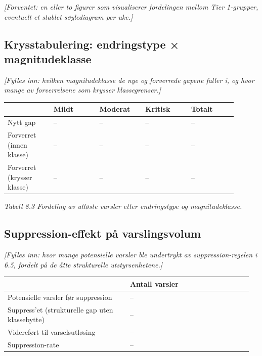 \documentclass[a4paper,11pt]{article}
\begin{document}
\textit{[Forventet: en eller to figurer som visualiserer fordelingen mellom Tier 1-grupper, eventuelt et stablet søylediagram per uke.]}

\subsection{Krysstabulering: endringstype × magnitudeklasse}

\textit{[Fylles inn: hvilken magnitudeklasse de nye og forverrede gapene faller i, og hvor mange av forverrelsene som krysser klassegrenser.]}

\begin{longtable}{|>{\RaggedRight}p{0.180\linewidth}|>{\RaggedRight}p{0.180\linewidth}|>{\RaggedRight}p{0.180\linewidth}|>{\RaggedRight}p{0.180\linewidth}|>{\RaggedRight}p{0.180\linewidth}|}
\hline
\textbf{} & \textbf{Mildt} & \textbf{Moderat} & \textbf{Kritisk} & \textbf{Totalt} \\
\hline
\endhead
Nytt gap & – & – & – & – \\
\hline
Forverret (innen klasse) & – & – & – & – \\
\hline
Forverret (krysser klasse) & – & – & – & – \\
\hline
\end{longtable}

\begin{center}\small\textit{Tabell 8.3 Fordeling av utløste varsler etter endringstype og magnitudeklasse.}\end{center}

\subsection{Suppression-effekt på varslingsvolum}

\textit{[Fylles inn: hvor mange potensielle varsler ble undertrykt av suppression-regelen i 6.5, fordelt på de åtte strukturelle utstyrsenhetene.]}

\begin{longtable}{|>{\RaggedRight}p{0.480\linewidth}|>{\RaggedRight}p{0.480\linewidth}|}
\hline
\textbf{} & \textbf{Antall varsler} \\
\hline
\endhead
Potensielle varsler før suppression & – \\
\hline
Suppress'et (strukturelle gap uten klassebytte) & – \\
\hline
Videreført til varselsutløsing & – \\
\hline
Suppression-rate & – \\
\hline
\end{longtable}
\end{document}
